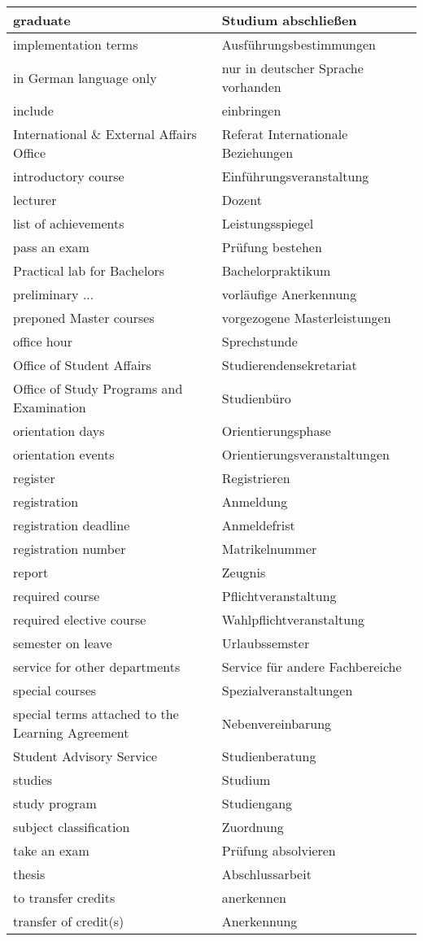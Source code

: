 \begin{longtable} {|p{.5\linewidth}|p{.5\linewidth}|}
\hline
graduate & Studium abschließen \\
\hline
implementation terms & Ausführungsbestimmungen \\
\hline
in German language only & nur in deutscher Sprache vorhanden \\
\hline
include & einbringen \\
\hline
International \& External Affairs Office & Referat Internationale Beziehungen \\
\hline
introductory course & Einführungsveranstaltung \\
\hline
lecturer & Dozent \\
\hline
list of achievements & Leistungsspiegel \\
\hline
pass an exam & Prüfung bestehen  \\
\hline
Practical lab for Bachelors & Bachelorpraktikum \\
\hline
preliminary ... & vorläufige Anerkennung\\
\hline
preponed Master courses & vorgezogene Masterleistungen \\
\hline
office hour & Sprechstunde \\
\hline
Office of Student Affairs & Studierendensekretariat \\
\hline
Office of Study Programs and Examination & Studienbüro \\
\hline
orientation days & Orientierungsphase \\
\hline
orientation events & Orientierungsveranstaltungen \\
\hline
register & Registrieren \\
\hline
registration & Anmeldung \\
\hline
registration deadline & Anmeldefrist \\
\hline
registration number & Matrikelnummer \\
\hline
report & Zeugnis \\
\hline
required course & Pflichtveranstaltung \\
\hline
required elective course & Wahlpflichtveranstaltung \\
\hline
semester on leave & Urlaubssemster \\
\hline
service for other departments & Service für andere Fachbereiche \\
\hline
special courses & Spezialveranstaltungen \\
\hline
special terms attached to the Learning Agreement & Nebenvereinbarung \\
\hline
Student Advisory Service & Studienberatung \\
\hline
studies & Studium \\
\hline
study program & Studiengang \\
\hline
subject classification & Zuordnung \\
\hline
take an exam & Prüfung absolvieren \\
\hline
thesis & Abschlussarbeit \\
\hline
to transfer credits & anerkennen \\
\hline
transfer of credit(s) & Anerkennung \\
\hline
\end{longtable}